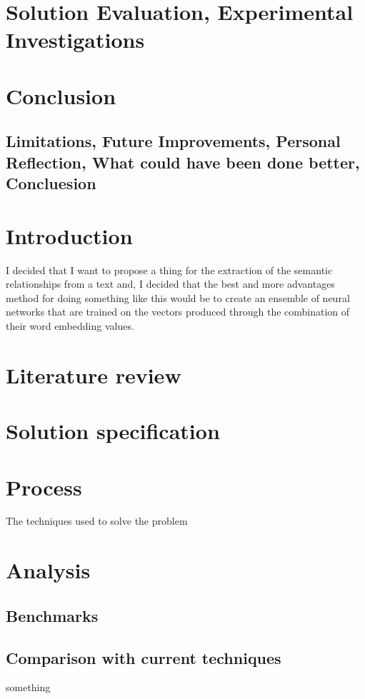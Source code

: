 \documentclass[11pt]{article} %
\begin{document}
\section{Solution Evaluation, Experimental Investigations}

\section{Conclusion}
\subsection{Limitations, Future Improvements, Personal Reflection, What could have been done better, Concluesion}



\section{Introduction}

I decided that I want to propose a thing for the extraction of the semantic relationships from a
text and, I decided that the best and more advantages method for doing something like this would be 
to create an ensemble of neural networks that are trained on the vectors produced through the 
combination of their word embedding values. 

\section{Literature review}

\section{Solution specification}

\section{Process}
The techniques used to solve the problem

\section{Analysis}

\subsection{Benchmarks}

\subsection{Comparison with current techniques}

something


\end{document}
